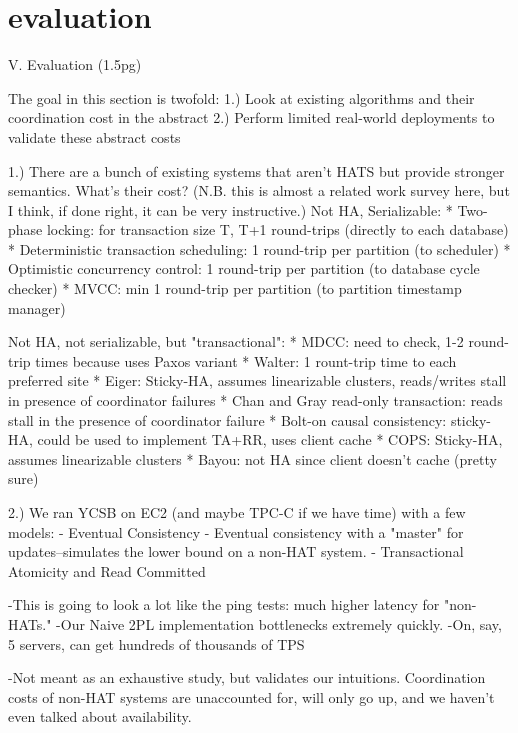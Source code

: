 
\section{evaluation}

\label{sec:evaluation}

V. Evaluation (1.5pg)

The goal in this section is twofold:
1.) Look at existing algorithms and their coordination cost in the abstract
2.) Perform limited real-world deployments to validate these abstract costs

1.) There are a bunch of existing systems that aren't HATS but provide stronger semantics. What's their cost? (N.B. this is almost a related work survey here, but I think, if done right, it can be very instructive.)
Not HA, Serializable:
* Two-phase locking: for transaction size T, T+1 round-trips (directly to each database)
* Deterministic transaction scheduling: 1 round-trip per partition (to scheduler)
* Optimistic concurrency control: 1 round-trip per partition (to database cycle checker)
* MVCC: min 1 round-trip per partition (to partition timestamp manager)

Not HA, not serializable, but "transactional":
* MDCC: need to check, 1-2 round-trip times because uses Paxos variant
* Walter: 1 rount-trip time to each preferred site
* Eiger: Sticky-HA, assumes linearizable clusters, reads/writes stall in presence of coordinator failures
* Chan and Gray read-only transaction: reads stall in the presence of coordinator failure
* Bolt-on causal consistency: sticky-HA, could be used to implement TA+RR, uses client cache
* COPS: Sticky-HA, assumes linearizable clusters
* Bayou: not HA since client doesn't cache (pretty sure)

2.) We ran YCSB on EC2 (and maybe TPC-C if we have time) with a few models:
	- Eventual Consistency
	- Eventual consistency with a "master" for updates--simulates the lower bound on a non-HAT system.
	- Transactional Atomicity and Read Committed
	
	-This is going to look a lot like the ping tests: much higher latency for "non-HATs."
	-Our Naive 2PL implementation bottlenecks extremely quickly.
	-On, say, 5 servers, can get hundreds of thousands of TPS

	-Not meant as an exhaustive study, but validates our intuitions. Coordination costs of non-HAT systems are unaccounted for, will only go up, and we haven't even talked about availability.
